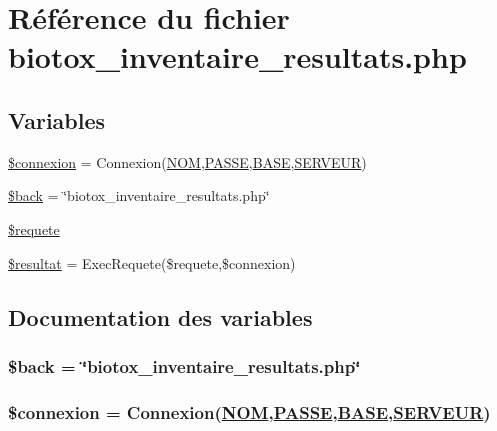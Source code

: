 \hypertarget{biotox__inventaire__resultats_8php}{
\section{R\'{e}f\'{e}rence du fichier biotox\_\-inventaire\_\-resultats.php}
\label{biotox__inventaire__resultats_8php}
}
\subsection*{Variables}
\begin{CompactItemize}
\item 
\hyperlink{biotox__inventaire__resultats_8php_a0}{\$connexion} = Connexion(\hyperlink{pma__connect_8php_a0}{NOM},\hyperlink{pma__connect_8php_a1}{PASSE},\hyperlink{pma__connect_8php_a3}{BASE},\hyperlink{pma__connect_8php_a2}{SERVEUR})
\item 
\hyperlink{biotox__inventaire__resultats_8php_a1}{\$back} = \char`\"{}biotox\_\-inventaire\_\-resultats.php\char`\"{}
\item 
\hyperlink{biotox__inventaire__resultats_8php_a2}{\$requete}
\item 
\hyperlink{biotox__inventaire__resultats_8php_a3}{\$resultat} = Exec\-Requete(\$requete,\$connexion)
\end{CompactItemize}


\subsection{Documentation des variables}
\hypertarget{biotox__inventaire__resultats_8php_a1}{
\subsubsection[\$back]{\setlength{\rightskip}{0pt plus 5cm}\$back = \char`\"{}biotox\_\-inventaire\_\-resultats.php\char`\"{}}}
\label{biotox__inventaire__resultats_8php_a1}


\hypertarget{biotox__inventaire__resultats_8php_a0}{
\subsubsection[\$connexion]{\setlength{\rightskip}{0pt plus 5cm}\$connexion = Connexion(\hyperlink{pma__connect_8php_a0}{NOM},\hyperlink{pma__connect_8php_a1}{PASSE},\hyperlink{pma__connect_8php_a3}{BASE},\hyperlink{pma__connect_8php_a2}{SERVEUR})}}
\label{biotox__inventaire__resultats_8php_a0}


